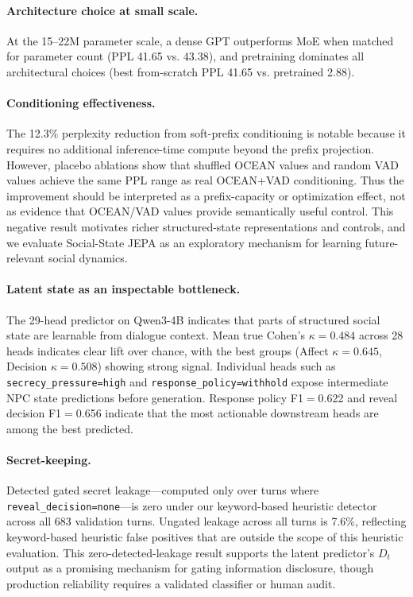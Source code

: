 \documentclass[11pt]{article}
\begin{document}
\paragraph{Architecture choice at small scale.}
At the 15--22M parameter scale, a dense GPT outperforms MoE when matched for parameter count (PPL 41.65 vs. 43.38), and pretraining dominates all architectural choices (best from-scratch PPL 41.65 vs. pretrained 2.88).

\paragraph{Conditioning effectiveness.}
The 12.3\% perplexity reduction from soft-prefix conditioning is notable because it requires no additional inference-time compute beyond the prefix projection.
However, placebo ablations show that shuffled OCEAN values and random VAD values achieve the same PPL range as real OCEAN+VAD conditioning.
Thus the improvement should be interpreted as a prefix-capacity or optimization effect, not as evidence that OCEAN/VAD values provide semantically useful control.
This negative result motivates richer structured-state representations and controls, and we evaluate Social-State JEPA as an exploratory mechanism for learning future-relevant social dynamics.

\paragraph{Latent state as an inspectable bottleneck.}
The 29-head predictor on Qwen3-4B indicates that parts of structured social state are learnable from dialogue context.
Mean true Cohen's $\kappa=0.484$ across 28 heads indicates clear lift over chance, with the best groups (Affect $\kappa=0.645$, Decision $\kappa=0.508$) showing strong signal.
Individual heads such as \texttt{secrecy\_pressure=high} and \texttt{response\_policy=withhold} expose intermediate NPC state predictions before generation.
Response policy F1$=$0.622 and reveal decision F1$=$0.656 indicate that the most actionable downstream heads are among the best predicted.

\paragraph{Secret-keeping.}
Detected gated secret leakage---computed only over turns where \texttt{reveal\_decision=none}---is zero under our keyword-based heuristic detector across all 683 validation turns.
Ungated leakage across all turns is 7.6\%, reflecting keyword-based heuristic false positives that are outside the scope of this heuristic evaluation.
This zero-detected-leakage result supports the latent predictor's $D_t$ output as a promising mechanism for gating information disclosure, though production reliability requires a validated classifier or human audit.
\end{document}
